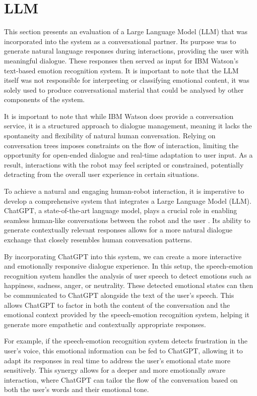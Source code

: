 \section{LLM}

This section presents an evaluation of a Large Language Model (LLM) that was incorporated into the system as a conversational partner. Its purpose was to generate natural language responses during interactions, providing the user with meaningful dialogue. These responses then served as input for IBM Watson's text-based emotion recognition system. It is important to note that the LLM itself was not responsible for interpreting or classifying emotional content, it was solely used to produce conversational material that could be analysed by other components of the system.

It is important to note that while IBM Watson does provide a conversation service, it is a structured approach to dialogue management, meaning it lacks the spontaneity and flexibility of natural human conversation. Relying on conversation trees imposes constraints on the flow of interaction, limiting the opportunity for open-ended dialogue and real-time adaptation to user input. As a result, interactions with the robot may feel scripted or constrained, potentially detracting from the overall user experience in certain situations.

To achieve a natural and engaging human-robot interaction, it is imperative to develop a comprehensive system that integrates a Large Language Model (LLM). ChatGPT, a state-of-the-art language model, plays a crucial role in enabling seamless human-like conversations between the robot and the user \cite{chatgpt}. Its ability to generate contextually relevant responses allows for a more natural dialogue exchange that closely resembles human conversation patterns.

By incorporating ChatGPT into this system, we can create a more interactive and emotionally responsive dialogue experience. In this setup, the speech-emotion recognition system handles the analysis of user speech to detect emotions such as happiness, sadness, anger, or neutrality. These detected emotional states can then be communicated to ChatGPT alongside the text of the user's speech. This allows ChatGPT to factor in both the content of the conversation and the emotional context provided by the speech-emotion recognition system, helping it generate more empathetic and contextually appropriate responses.

For example, if the speech-emotion recognition system detects frustration in the user's voice, this emotional information can be fed to ChatGPT, allowing it to adapt its responses in real time to address the user's emotional state more sensitively. This synergy allows for a deeper and more emotionally aware interaction, where ChatGPT can tailor the flow of the conversation based on both the user's words and their emotional tone.

